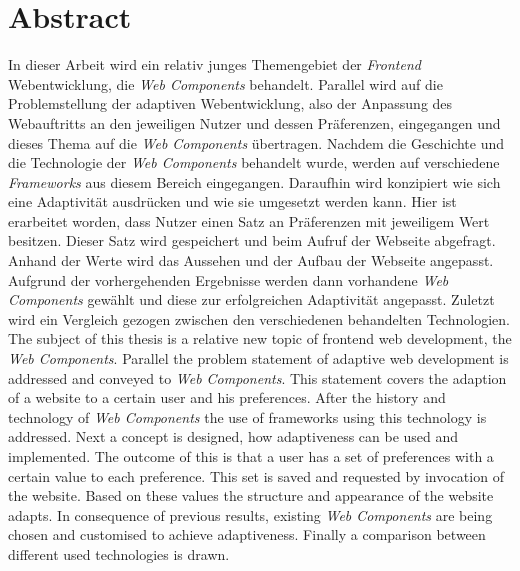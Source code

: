 \documentclass[12pt, paper=a4, bibtotoc, toc=listof, headsepline=true]{scrreprt}
\newcommand{\listoflistings}{\listof{listing}{Listing Verzeichnis}}
\begin{document}









\chapter*{Abstract}
In dieser Arbeit wird ein relativ junges Themengebiet der \emph{Frontend} Webentwicklung, die \emph{Web Components} behandelt. Parallel wird auf die Problemstellung der adaptiven Webentwicklung, also der Anpassung des Webauftritts an den jeweiligen Nutzer und dessen Präferenzen, eingegangen und dieses Thema auf die \emph{Web Components} übertragen. Nachdem die Geschichte und die Technologie der \emph{Web Components} behandelt wurde, werden auf verschiedene \emph{Frameworks} aus diesem Bereich eingegangen. Daraufhin wird konzipiert wie sich eine Adaptivität ausdrücken und wie sie umgesetzt werden kann. Hier ist erarbeitet worden, dass Nutzer einen Satz an Präferenzen mit jeweiligem Wert besitzen. Dieser Satz wird gespeichert und beim Aufruf der Webseite abgefragt. Anhand der Werte wird das Aussehen und der Aufbau der Webseite angepasst. Aufgrund der vorhergehenden Ergebnisse werden dann vorhandene \emph{Web Components} gewählt und diese zur erfolgreichen Adaptivität angepasst. Zuletzt wird ein Vergleich gezogen zwischen den verschiedenen behandelten Technologien.     
\newline
\newline
The subject of this thesis is a relative new topic of frontend web development, the \emph{Web Components}. Parallel the problem statement of adaptive web development is addressed and conveyed to \emph{Web Components}. This statement covers the adaption of a website to a certain user and his preferences. After the history and technology of \emph{Web Components} the use of frameworks using this technology is addressed. Next a concept is designed, how adaptiveness can be used and implemented. The outcome of this is that a user has a set of preferences with a certain value to each preference. This set is saved and requested by invocation of the website. Based on these values the structure and appearance of the website adapts. In consequence of previous results, existing \emph{Web Components} are being chosen and customised to achieve adaptiveness. Finally a comparison between different used technologies is drawn.    
\listoflistings
\listoffigures
\end{document}
